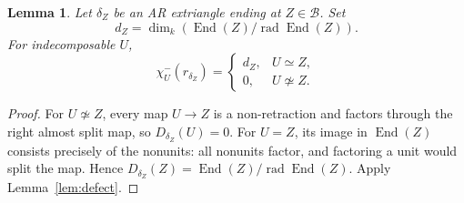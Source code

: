 \documentclass[pdflatex,sn-mathphys-num]{sn-jnl}
\numberwithin{equation}{section}
\newtheorem{lemma}[theorem]{Lemma}
\theoremstyle{definition}
\theoremstyle{remark}\newtheorem{remark}[theorem]{Remark}
\newcommand{\End}{\operatorname{End}}
\newcommand{\rad}{\operatorname{rad}}
\newcommand{\dimk}{\dim_k}
\begin{document}
\begin{lemma}\label{lem:ARsupport}
Let $\delta_Z$ be an AR extriangle ending at $Z\in\mathcal B$. Set
\[
 d_Z=\dimk(\End(Z)/\rad\End(Z)).
\]
For indecomposable $U$,
\[
 \chi^-_U(r_{\delta_Z})=
 \begin{cases}d_Z,&U\simeq Z,\\0,&U\not\simeq Z.\end{cases}
\]
\end{lemma}
\begin{proof}
For $U\not\simeq Z$, every map $U\to Z$ is a non-retraction and
factors through the right almost split map, so $D_{\delta_Z}(U)=0$.
For $U=Z$, its image in $\End(Z)$ consists precisely of the nonunits:
all nonunits factor, and factoring a unit would split the map.
Hence $D_{\delta_Z}(Z)=\End(Z)/\rad\End(Z)$. Apply
Lemma~\ref{lem:defect}.
\end{proof}
\end{document}

